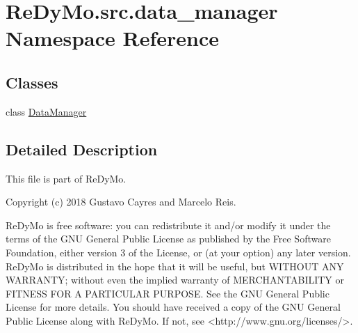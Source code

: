 \hypertarget{namespaceReDyMo_1_1src_1_1data__manager}{}\section{Re\+Dy\+Mo.\+src.\+data\+\_\+manager Namespace Reference}
\label{namespaceReDyMo_1_1src_1_1data__manager}
\subsection*{Classes}
\begin{DoxyCompactItemize}
\item 
class \mbox{\hyperlink{classReDyMo_1_1src_1_1data__manager_1_1DataManager}{Data\+Manager}}
\end{DoxyCompactItemize}


\subsection{Detailed Description}
\begin{DoxyVerb}This file is part of ReDyMo.

    Copyright (c) 2018  Gustavo Cayres and Marcelo Reis.

    ReDyMo is free software: you can redistribute it and/or modify it
    under the terms of the GNU General Public License as published by the
    Free Software Foundation, either version 3 of the License, or (at your
    option) any later version.
    ReDyMo is distributed in the hope that it will be useful, but WITHOUT
    ANY WARRANTY; without even the implied warranty of MERCHANTABILITY or
    FITNESS FOR A PARTICULAR PURPOSE. See the GNU General Public License
    for more details.
    You should have received a copy of the GNU General Public License along
    with ReDyMo. If not, see <http://www.gnu.org/licenses/>.\end{DoxyVerb}
 
